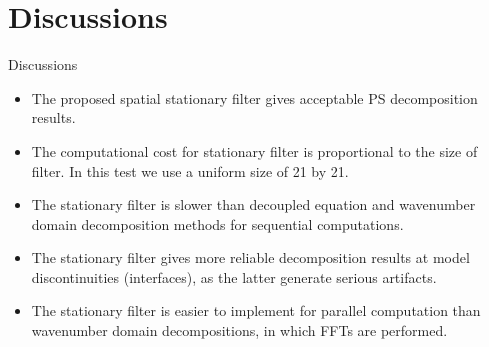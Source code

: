 \documentclass[aspectratio=43]{beamer}
\begin{document}
\section{Discussions}
\begin{frame}{Discussions}
\begin{itemize}
\item{The proposed spatial stationary filter gives acceptable PS decomposition results.}
\item{The computational cost for stationary filter is proportional to the size of filter. In this test we use a uniform size of 21 by 21.}
\item{The stationary filter is slower than decoupled equation and wavenumber domain decomposition methods for sequential computations.}
\item{The stationary filter gives more reliable decomposition results at model discontinuities (interfaces), as the latter generate serious artifacts.}
\item{The stationary filter is easier to implement for parallel computation than wavenumber domain decompositions, in which FFTs are performed.}
\end{itemize}
\end{frame}
\end{document}

